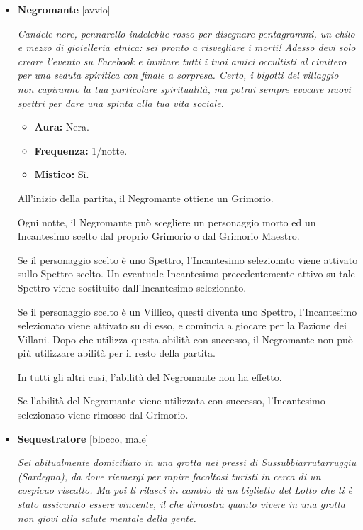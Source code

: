 \documentclass[a4paper,10pt]{article}
\begin{document}
\begin{itemize}
      \item \textbf{Negromante} [avvio]

            \emph{Candele nere, pennarello indelebile rosso per disegnare pentagrammi, un chilo e mezzo di gioielleria etnica: sei pronto a risvegliare i morti! Adesso devi solo creare l'evento su Facebook e invitare tutti i tuoi amici occultisti al cimitero per una seduta spiritica con finale a sorpresa. Certo, i bigotti del villaggio non capiranno la tua particolare spiritualità, ma potrai sempre evocare nuovi spettri per dare una spinta alla tua vita sociale.}

            \begin{multicols}{3}
                  \begin{itemize}
                        \item \textbf{Aura:} Nera.
                        \item \textbf{Frequenza:} 1/notte.
                        \item \textbf{Mistico:} Sì.
                  \end{itemize}
            \end{multicols}

            All'inizio della partita, il Negromante ottiene un Grimorio.

            Ogni notte, il Negromante può scegliere un personaggio morto ed un Incantesimo scelto dal proprio Grimorio o dal Grimorio Maestro.

            Se il personaggio scelto è uno Spettro, l'Incantesimo selezionato viene attivato sullo Spettro scelto. Un eventuale Incantesimo precedentemente attivo su tale Spettro viene sostituito dall'Incantesimo selezionato.

            Se il personaggio scelto è un Villico, questi diventa uno Spettro, l'Incantesimo selezionato viene attivato su di esso, e comincia a giocare per la Fazione dei Villani. Dopo che utilizza questa abilità con successo, il Negromante non può più utilizzare abilità per il resto della partita.

            In tutti gli altri casi, l'abilità del Negromante non ha effetto.

            Se l'abilità del Negromante viene utilizzata con successo, l'Incantesimo selezionato viene rimosso dal Grimorio.


      \item \textbf{Sequestratore} [blocco, male]

            \emph{Sei abitualmente domiciliato in una grotta nei pressi di Sussubbiarrutarruggiu (Sardegna), da dove riemergi per rapire facoltosi turisti in cerca di un cospicuo riscatto. Ma poi li rilasci in cambio di un biglietto del Lotto che ti è stato assicurato essere vincente, il che dimostra quanto vivere in una grotta non giovi alla salute mentale della gente.}


\end{itemize}
\end{document}
